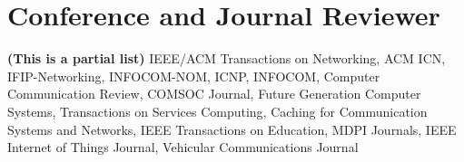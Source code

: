 \section{Conference and Journal Reviewer}

\textbf{(This is a partial list) }IEEE/ACM Transactions on Networking, ACM ICN, IFIP-Networking, INFOCOM-NOM, ICNP, INFOCOM, Computer Communication Review, COMSOC Journal, Future Generation Computer Systems, Transactions on Services Computing, Caching for Communication Systems and Networks, IEEE Transactions on Education, MDPI Journals, IEEE Internet of Things Journal, Vehicular Communications Journal